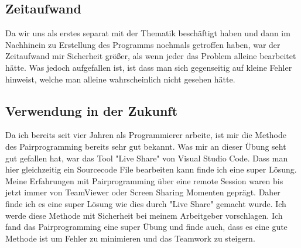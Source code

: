 \documentclass[12pt]{article}
\begin{document}
\subsection{Zeitaufwand}
Da wir uns als erstes separat mit der Thematik beschäftigt haben und dann im Nachhinein zu Erstellung des Programms nochmals getroffen haben, war der Zeitaufwand mir Sicherheit größer, als wenn jeder das Problem alleine bearbeitet hätte. Was jedoch aufgefallen ist, ist dass man sich gegenseitig auf kleine Fehler hinweist, welche man alleine wahrscheinlich nicht gesehen hätte.
\subsection{Verwendung in der Zukunft}
Da ich bereits seit vier Jahren als Programmierer arbeite, ist mir die Methode des Pairprogramming bereits sehr gut bekannt. Was mir an dieser Übung seht gut gefallen hat, war das Tool "Live Share" von Visual Studio Code. Dass man hier gleichzeitig ein Sourcecode File bearbeiten kann finde ich eine super Lösung. Meine Erfahrungen mit Pairprogramming über eine remote Session waren bis jetzt immer von TeamViewer oder Screen Sharing Momenten geprägt. Daher finde ich es eine super Lösung wie dies durch "Live Share" gemacht wurde. Ich werde diese Methode mit Sicherheit bei meinem Arbeitgeber vorschlagen. Ich fand das Pairprogramming eine super Übung und finde auch, dass es eine gute Methode ist um Fehler zu minimieren und das Teamwork zu steigern.
\end{document}
